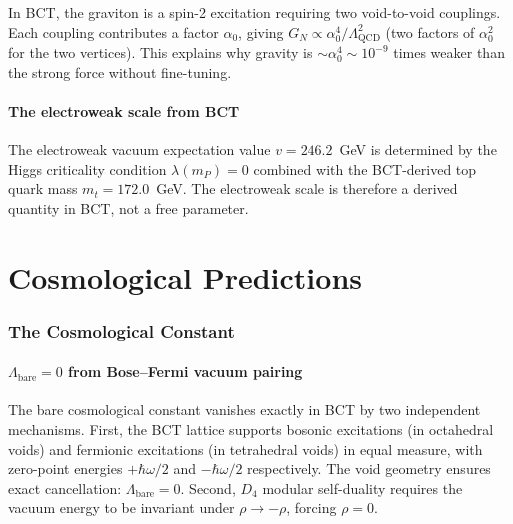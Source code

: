 \documentclass[review,number,sort&compress]{elsarticle}
\newcommand{\azero}{\alpha_0}
\newcommand{\LQCD}{\Lambda_{\mathrm{QCD}}}
\newcommand{\mP}{m_P}
\newcommand{\Dfour}{D_4}
\begin{document}
In BCT, the graviton is a spin-2 excitation requiring two void-to-void
couplings. Each coupling contributes a factor $\azero$, giving
$G_N \propto \azero^4 / \LQCD^2$ (two factors of $\azero^2$ for the
two vertices). This explains why gravity is $\sim \azero^4 \sim 10^{-9}$
times weaker than the strong force without fine-tuning.

\subsection{The electroweak scale from BCT}

The electroweak vacuum expectation value $v = 246.2$~GeV is determined by
the Higgs criticality condition $\lambda(\mP) = 0$ combined with the
BCT-derived top quark mass $m_t = 172.0$~GeV. The electroweak scale
is therefore a derived quantity in BCT, not a free parameter.


\part{Cosmological Predictions}
\label{part:cosmology}

\section{The Cosmological Constant}
\label{sec:CC}

\subsection{$\Lambda_{\mathrm{bare}} = 0$ from Bose--Fermi vacuum pairing}

The bare cosmological constant vanishes exactly in BCT by two independent
mechanisms. First, the BCT lattice supports bosonic excitations (in
octahedral voids) and fermionic excitations (in tetrahedral voids) in
equal measure, with zero-point energies $+\hbar\omega/2$ and
$-\hbar\omega/2$ respectively. The void geometry ensures exact
cancellation: $\Lambda_{\mathrm{bare}} = 0$. Second, $\Dfour$ modular
self-duality requires the vacuum energy to be invariant under
$\rho \to -\rho$, forcing $\rho = 0$.
\end{document}
